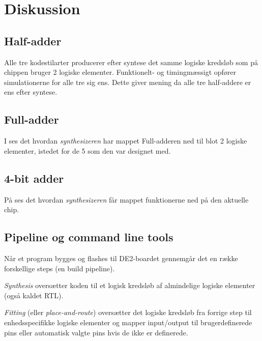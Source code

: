 \section{Diskussion}

\subsection{Half-adder}

Alle tre kodestilarter producerer efter syntese det samme logiske kredsløb som
på chippen bruger 2 logiske elementer. Funktionelt- og timingmæssigt opfører
simulationerne for alle tre sig ens. Dette giver mening da alle tre half-addere
er ens efter syntese.

\subsection{Full-adder}

I  ses det hvordan \emph{synthesizeren} har mappet Full-adderen ned til blot 2 logiske elementer, istedet for de 5 som den var designet med.


\subsection{4-bit adder}


På  ses det hvordan \emph{synthesizeren} får mappet funktionerne ned på den aktuelle chip.

\subsection{Pipeline og command line tools}

Når et program bygges og flashes til DE2-boardet gennemgår det en række
forskellige steps (en build pipeline).

\emph{Synthesis} oversætter koden til et logisk kredsløb af almindelige logiske elementer (også kaldet
RTL).

\emph{Fitting} (eller \emph{place-and-route}) oversætter det logiske
kredsløb fra forrige step til enhedsspecifikke logiske elementer og mapper
input/output til brugerdefinerede pins eller automatisk valgte pins hvis de ikke
er definerede.

